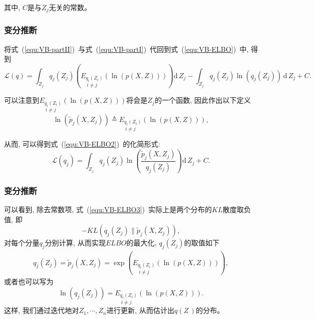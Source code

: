 \documentclass[10pt]{beamer}
\begin{document}
{\begin{frame}[c]
    其中, $C$是与$Z_j$无关的常数。
\end{frame}

\begin{frame}[c]
    \frametitle{变分推断}
    将式~(\ref{equ:VB-partII})~与式~(\ref{equ:VB-partI})~代回到式~(\ref{equ:VB-ELBO})~中, 得到
    \begin{equation}
        \label{equ:VB-ELBO2}
        \mathcal{L}(q)=\int_{Z_{j}} q_{j}\left(Z_{j}\right)\left(\underset{i\not=j}{E_{q_i(Z_i)}}\left(\ln (p(X, Z))\right)\right)\text{d}\, Z_{j}-\int_{Z_j}q_j(Z_j)\ln(q_j(Z_j))\,\text{d}\,Z_j+C. 
    \end{equation}

    \pause 可以注意到$\underset{i\not=j}{E_{q_i(Z_i)}}\left(\ln (p(X, Z))\right)$将会是$Z_j$的一个函数, 因此作出以下定义
    \begin{equation}
        \ln \left(\tilde{p}_{j}\left(X, Z_{j}\right)\right)\triangleq\underset{i\not=j}{E_{q_i(Z_i)}}\left(\ln (p(X, Z))\right), 
    \end{equation}
    
    \pause 从而, 可以得到式~(\ref{equ:VB-ELBO2})~的化简形式: 
    \begin{equation}
        \label{equ:VB-ELBO3}
        \mathcal{L}(q_j)=\int_{Z_j}q_j(Z_j)\ln\left(\frac{\tilde{p}_{j}\left(X, Z_{j}\right)}{q_j(Z_j)}\right)\text{d}\,Z_j+C. 
    \end{equation}
\end{frame}

\begin{frame}[c]
    \frametitle{变分推断}
    可以看到, 除去常数项, 式~(\ref{equ:VB-ELBO3})~实际上是两个分布的$KL$散度取负值, 即
    \[-KL\left(q_j(Z_j)\|\tilde{p}_{j}\left(X, Z_{j}\right)\right), \]
    \pause 对每个分量$q_j$分别计算, 从而实现$ELBO$的最大化, $q_j(Z_j)$的取值如下
    \begin{equation}
        \begin{aligned}
            q_j(Z_j)=\tilde{p}_{j}\left(X, Z_{j}\right)=\exp\left(\underset{i\not=j}{E_{q_i(Z_i)}}\left(\ln (p(X, Z))\right)\right), 
        \end{aligned}
    \end{equation}
    \pause 或者也可以写为
    \begin{equation}
        \ln(q_j(Z_j))=\underset{i\not=j}{E_{q_i(Z_i)}}\left(\ln (p(X, Z))\right). 
    \end{equation}
    这样, 我们通过迭代地对$Z_1,\cdots,Z_n$进行更新, 从而估计出$q(Z\,)$的分布。
\end{frame}

}
\end{document}
